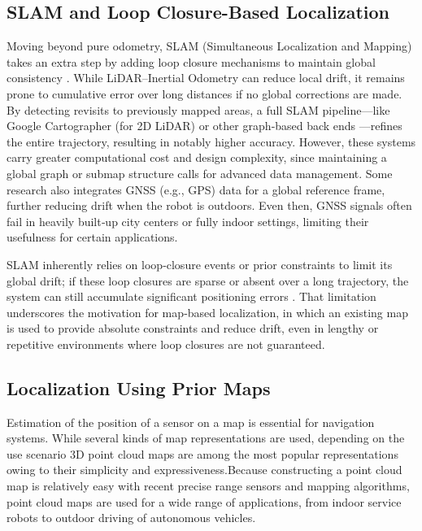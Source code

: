 \subsection{SLAM and Loop Closure-Based Localization}
Moving beyond pure odometry, SLAM (Simultaneous Localization and Mapping) takes an extra step by adding loop closure mechanisms to maintain global consistency \cite{cadena2016past}. While LiDAR–Inertial Odometry can reduce local drift, it remains prone to cumulative error over long distances if no global corrections are made. By detecting revisits to previously mapped areas, a full SLAM pipeline—like Google Cartographer (for 2D LiDAR) \cite{hess2016real} or other graph‐based back ends \cite{grisetti_gmapping}—refines the entire trajectory, resulting in notably higher accuracy. However, these systems carry greater computational cost and design complexity, since maintaining a global graph or submap structure calls for advanced data management. Some research also integrates GNSS (e.g., GPS) data for a global reference frame, further reducing drift when the robot is outdoors. Even then, GNSS signals often fail in heavily built‐up city centers or fully indoor settings, limiting their usefulness for certain applications.

SLAM inherently relies on loop‐closure events or prior constraints to limit its global drift; if these loop closures are sparse or absent over a long trajectory, the system can still accumulate significant positioning errors \cite{grisetti_gmapping, cadena2016past}. That limitation underscores the motivation for map‐based localization, in which an existing map is used to provide absolute constraints and reduce drift, even in lengthy or repetitive environments where loop closures are not guaranteed.

\subsection{Localization Using Prior Maps}
Estimation of the position of a sensor on a map is essential for navigation systems. While several
kinds of map representations are used, depending on the use scenario 3D point cloud maps are among the most popular representations owing to their simplicity and expressiveness.\cite{koide2024tightly}Because constructing a point cloud map is relatively easy with recent precise range sensors and mapping algorithms, point cloud maps are used for a wide range of applications, from indoor service robots to outdoor driving of autonomous vehicles.


